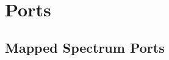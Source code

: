 \documentclass[12pt,twoside,openright,a4paper]{book}
\begin{document}
~ %

\minitoc

\pagebreak
\section{Ports}



\newcommand{\zxsee}[1]{(see \ref{#1})}

\subsection{Mapped Spectrum Ports}

\begingroup
	\newcommand{\zxport}[4]{
		\tt {#1} & 
		{\tt \$#2} & 
		\IfEq{#3}{}{}{\tt \%#3} &
		#4\\
	}

	\setlength{\extrarowheight}{5pt}
\end{document}
